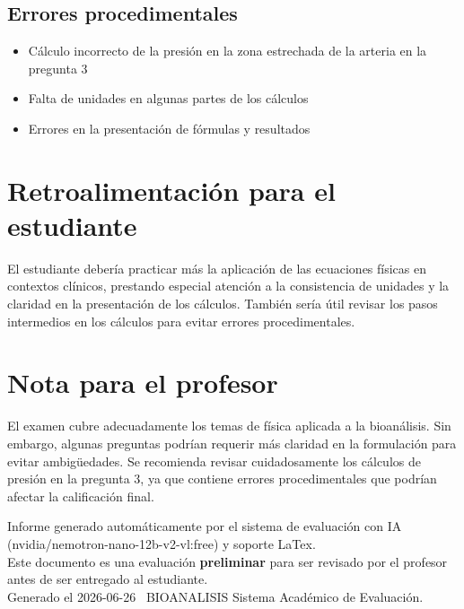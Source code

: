 \documentclass[11pt,a4paper]{article}
\begin{document}
\subsection*{Errores procedimentales}
\begin{itemize}[leftmargin=1.5em, itemsep=2pt]
  \item Cálculo incorrecto de la presión en la zona estrechada de la arteria en la pregunta 3
  \item Falta de unidades en algunas partes de los cálculos
  \item Errores en la presentación de fórmulas y resultados
\end{itemize}

\section*{Retroalimentación para el estudiante}
\begin{tcolorbox}[cajaRecomendacion, title={Dirigido a: johannys rojas 32824230}]
El estudiante debería practicar más la aplicación de las ecuaciones físicas en contextos clínicos, prestando especial atención a la consistencia de unidades y la claridad en la presentación de los cálculos. También sería útil revisar los pasos intermedios en los cálculos para evitar errores procedimentales.
\end{tcolorbox}

\section*{Nota para el profesor}
\begin{tcolorbox}[
  enhanced, breakable,
  colback=yellow!8, colframe=yellow!60!black,
  fonttitle=\bfseries, coltitle=black,
  title={Observaciones para revisión manual},
  top=4pt, bottom=4pt, left=8pt, right=8pt,
]
El examen cubre adecuadamente los temas de física aplicada a la bioanálisis. Sin embargo, algunas preguntas podrían requerir más claridad en la formulación para evitar ambigüedades. Se recomienda revisar cuidadosamente los cálculos de presión en la pregunta 3, ya que contiene errores procedimentales que podrían afectar la calificación final.
\end{tcolorbox}

\vspace{12pt}
\begin{center}
  \footnotesize\color{gray}
  Informe generado automáticamente por el sistema de evaluación con IA (nvidia/nemotron-nano-12b-v2-vl:free) y soporte LaTex. \\
  Este documento es una evaluación \textbf{preliminar} para ser revisado por el profesor antes de ser entregado al 
  estudiante. \\
  Generado el 2026-06-26 \textbullet\ BIOANALISIS Sistema Académico de Evaluación.
  \end{center}
\end{document}
